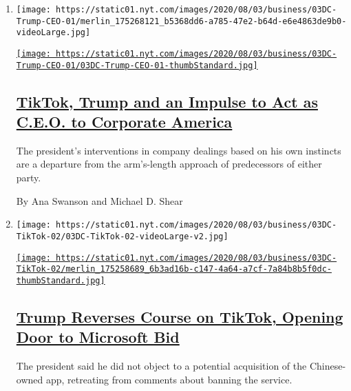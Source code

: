 \begin{enumerate}
\def\labelenumi{\arabic{enumi}.}
\item
  \texttt{[image: https://static01.nyt.com/images/2020/08/03/business/03DC-Trump-CEO-01/merlin\_175268121\_b5368dd6-a785-47e2-b64d-e6e4863de9b0-videoLarge.jpg]}

  \href{/2020/08/03/business/economy/trump-tiktok-china-business.html}{\texttt{[image: https://static01.nyt.com/images/2020/08/03/business/03DC-Trump-CEO-01/03DC-Trump-CEO-01-thumbStandard.jpg]}}

  \hypertarget{tiktok-trump-and-an-impulse-to-act-as-ceo-to-corporate-america}{%
  \subsection{\texorpdfstring{\href{/2020/08/03/business/economy/trump-tiktok-china-business.html}{TikTok,
  Trump and an Impulse to Act as C.E.O. to Corporate
  America}}{TikTok, Trump and an Impulse to Act as C.E.O. to Corporate America}}\label{tiktok-trump-and-an-impulse-to-act-as-ceo-to-corporate-america}}

  The president's interventions in company dealings based on his own
  instincts are a departure from the arm's-length approach of
  predecessors of either party.

  By Ana Swanson and Michael D. Shear
\item
  \texttt{[image: https://static01.nyt.com/images/2020/08/03/business/03DC-TikTok-02/03DC-TikTok-02-videoLarge-v2.jpg]}

  \href{/2020/08/03/technology/trump-tiktok-microsoft.html}{\texttt{[image: https://static01.nyt.com/images/2020/08/03/business/03DC-TikTok-02/merlin\_175258689\_6b3ad16b-c147-4a64-a7cf-7a84b8b5f0dc-thumbStandard.jpg]}}

  \hypertarget{trump-reverses-course-on-tiktok-opening-door-to-microsoft-bid}{%
  \subsection{\texorpdfstring{\href{/2020/08/03/technology/trump-tiktok-microsoft.html}{Trump
  Reverses Course on TikTok, Opening Door to Microsoft
  Bid}}{Trump Reverses Course on TikTok, Opening Door to Microsoft Bid}}\label{trump-reverses-course-on-tiktok-opening-door-to-microsoft-bid}}

  The president said he did not object to a potential acquisition of the
  Chinese-owned app, retreating from comments about banning the service.


\end{enumerate}
